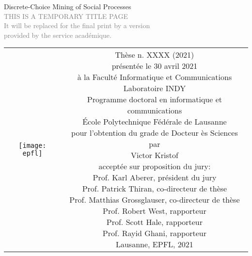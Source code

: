 \begin{titlepage}
	\begin{center}
		\sffamily


		\null\vspace{2cm}
		{\huge Discrete-Choice Mining of Social Processes} \\[24pt]
		\textcolor{gray}{\small{THIS IS A TEMPORARY TITLE PAGE \\ It will be replaced for the final print by a version \\ provided by the service académique.}}

		\vfill

		\begin{tabular} {cc}
			\parbox{0.3\textwidth}{\texttt{[image: epfl]}}
			 &
			\parbox{0.7\textwidth}{%
			Thèse n. XXXX (2021)                                 \\
			présentée le 30 avril 2021                           \\
			à la Faculté Informatique et Communications          \\
			Laboratoire INDY                                     \\
			Programme doctoral en informatique et communications \\
			École Polytechnique Fédérale de Lausanne             \\[6pt]
			pour l'obtention du grade de Docteur ès Sciences     \\
			par                                                  \\[4pt]
			\null \hspace{3em} Victor Kristof                    \\[9pt]
				\small
			acceptée sur proposition du jury:                    \\[4pt]
			Prof. Karl Aberer, président du jury                 \\
			Prof. Patrick Thiran, co-directeur de thèse          \\
			Prof. Matthias Grossglauser, co-directeur de thèse   \\
			Prof. Robert West, rapporteur                        \\
			Prof. Scott Hale, rapporteur                         \\
			Prof. Rayid Ghani, rapporteur                        \\[12pt]
				Lausanne, EPFL, 2021}
		\end{tabular}
	\end{center}
	\vspace{2cm}
\end{titlepage}
